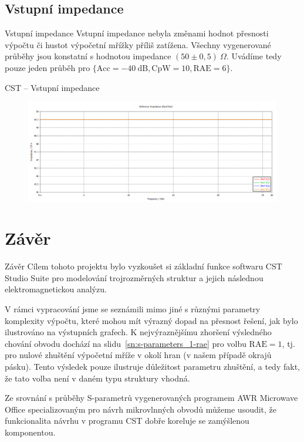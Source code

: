 \documentclass[aspectratio=169, 11pt, hyperref={unicode}]{beamer}
\begin{document}
\subsection{Vstupní impedance}
\begin{frame}{Vstupní impedance}
    Vstupní impedance nebyla změnami hodnot přesnosti výpočtu či hustot výpočetní mřížky příliš zatížena. Všechny vygenerované průběhy jsou konstatní s hodnotou impedance $(50 \pm 0,5)\ \Omega$. Uvádíme tedy pouze jeden průběh pro $\{\text{Acc} = -40\ \text{dB}, \text{CpW} = 10, \text{RAE} = 6\}$.
\end{frame}
\begin{frame}{CST -- Vstupní impedance}
	\begin{figure}[!ht]
		\centering
		\includegraphics[width=.8\textwidth]{src/CST_Reference-Impedance_40dB_10-cpw_6-cntm.png}
	\end{figure}
\end{frame}

\section{Závěr}
\begin{frame}{Závěr}
	Cílem tohoto projektu bylo vyzkoušet si základní funkce softwaru CST Studio Suite pro modelování trojrozměrných struktur a jejich následnou elektromagnetickou analýzu.
    
    V rámci vypracování jsme se seznámili mimo jiné s různými parametry komplexity výpočtu, které mohou mít výrazný dopad na přesnost řešení, jak bylo ilustrováno na výstupních grafech. K nejvýraznějšímu zhoršení výsledného chování obvodu dochází na slidu~\ref{sn:s-parameters_1-rae} pro volbu $\text{RAE} = 1$, tj. pro nulové zhuštění výpočetní mříže v okolí hran (v našem případě okrajů pásku). Tento výsledek pouze ilustruje důležitost parametru zhuštění, a tedy fakt, že tato volba není v daném typu struktury vhodná.

    Ze srovnání s průběhy S-parametrů vygenerovaných programem AWR Microwave Office specializovaným pro návrh mikrovlnných obvodů můžeme usoudit, že funkcionalita návrhu v programu CST dobře koreluje se zamýšlenou komponentou.
\end{frame}

\end{document}
